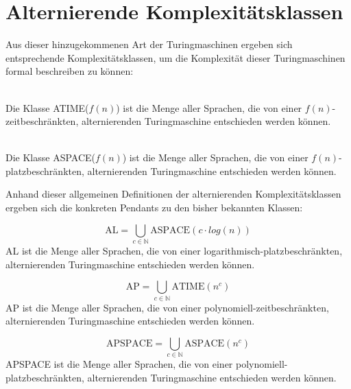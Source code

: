 \section{Alternierende Komplexitätsklassen} \label{section: Komplexitätsklassen bei alternierenden TMs}
Aus dieser hinzugekommenen Art der Turingmaschinen ergeben sich entsprechende Komplexitätsklassen,
um die Komplexität dieser Turingmaschinen formal beschreiben zu können:

\begin{definition} \cite[S.410]{sipser_introduction_2012} \\
    Die Klasse ATIME($f(n)$) ist die Menge  aller Sprachen, die von einer $f(n)$-zeitbeschränkten, alternierenden Turingmaschine entschieden werden können.
\end{definition}

\begin{definition} \cite[S.410]{sipser_introduction_2012} \\
    Die Klasse ASPACE($f(n)$) ist die Menge aller Sprachen, die von einer $f(n)$-platzbeschränkten, alternierenden Turingmaschine entschieden werden können.
\end{definition}

Anhand dieser allgemeinen Definitionen der alternierenden Komplexitätsklassen ergeben sich die konkreten Pendants zu den bisher bekannten Klassen:

\begin{definition}\cite[S.410]{sipser_introduction_2012}
    \begin{equation}
        \text{AL} = \bigcup_{c \in \mathbb{N}} \text{ASPACE}(c \cdot log(n))
    \end{equation}
    AL ist die Menge aller Sprachen, die von einer logarithmisch-platzbeschränkten, alternierenden Turingmaschine entschieden werden können.
\end{definition}

\begin{definition}\cite[S.100]{arora_computational_2009}
    \begin{equation}
        \text{AP} = \bigcup_{c \in \mathbb{N}} \text{ATIME}(n^c)
    \end{equation} 
    AP ist die Menge aller Sprachen, die von einer polynomiell-zeitbeschränkten, alternierenden Turingmaschine entschieden werden können.
\end{definition}

\begin{definition}\cite[S.410]{sipser_introduction_2012}
    \begin{equation}
        \text{APSPACE} = \bigcup_{c \in \mathbb{N}} \text{ASPACE}(n^c)
    \end{equation}
    APSPACE ist die Menge aller Sprachen, die von einer polynomiell-platzbeschränkten, alternierenden Turingmaschine entschieden werden können. 
\end{definition}

